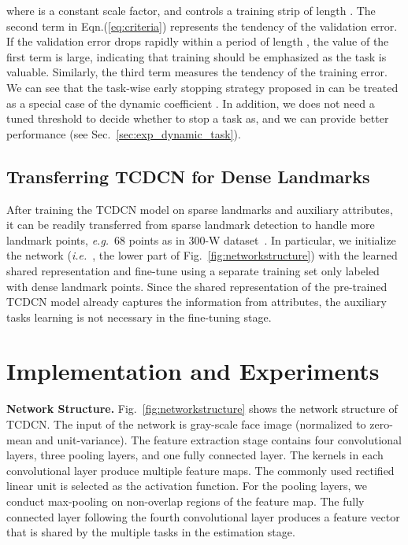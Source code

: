\documentclass[10pt,journal,compsoc]{IEEEtran}
\newcommand{\eg}{\emph{e.g.}}
\newcommand{\ie}{\emph{i.e.}~}
\begin{document}
where  is a constant scale factor, and  controls a training strip of length . The second term in Eqn.(\ref{eq:criteria}) represents the tendency of the validation error. If the validation error drops rapidly within a period of length , the value of the first term is large, indicating that training should be emphasized as the task is valuable. Similarly, the third term measures the tendency of the training error. We can see that the task-wise early stopping strategy proposed in\cite{zhang2014facial} can be treated as a special case of the dynamic coefficient . In addition, we does not need a tuned threshold to decide whether to stop a task as\cite{zhang2014facial}, and we can provide better performance (see Sec.~\ref{sec:exp_dynamic_task}).



\subsection{Transferring TCDCN for Dense Landmarks}
\label{sec:300w}
 After training the TCDCN model on sparse landmarks and auxiliary attributes, it can be readily transferred from sparse landmark detection to handle more landmark points, \eg~68 points as in 300-W dataset~\cite{300w}. In particular, we initialize the network (\ie, the lower part of Fig.~\ref{fig:networkstructure}) with the learned shared representation and fine-tune using a separate training set only labeled with dense landmark points. Since the shared representation of the pre-trained TCDCN model already captures the information from attributes, the auxiliary tasks learning is not necessary in the fine-tuning stage.

\section{Implementation and Experiments}

\label{sec:experiments}
\textbf{Network Structure.} Fig.~\ref{fig:networkstructure} shows the network structure of TCDCN. The input of the network is  gray-scale face image (normalized to zero-mean and unit-variance). The feature extraction stage contains four convolutional layers, three pooling layers, and one fully connected layer. The kernels in each convolutional layer produce multiple feature maps. The commonly used rectified linear unit is selected as the activation function. For the pooling layers, we conduct max-pooling on non-overlap regions of the feature map. The fully connected layer following the fourth convolutional layer produces a feature vector that is shared by the multiple tasks in the estimation stage.
\end{document}
